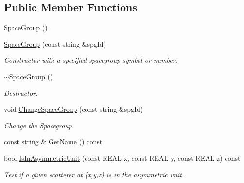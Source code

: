 \subsection*{Public Member Functions}
\begin{DoxyCompactItemize}
\item 
\mbox{\hyperlink{class_obj_cryst_1_1_space_group_a5f5f5b814480e6ab109c22926cc359ca}{Space\+Group}} ()
\item 
\mbox{\hyperlink{class_obj_cryst_1_1_space_group_a5db1daaae23fab45637555f74c705b3e}{Space\+Group}} (const string \&spg\+Id)
\begin{DoxyCompactList}\small\item\em Constructor with a specified spacegroup symbol or number. \end{DoxyCompactList}\item 
\mbox{\label{class_obj_cryst_1_1_space_group_a9dfc390a5e455426c323ee7a8d6ced10}} 
\mbox{\hyperlink{class_obj_cryst_1_1_space_group_a9dfc390a5e455426c323ee7a8d6ced10}{$\sim$\+Space\+Group}} ()
\begin{DoxyCompactList}\small\item\em Destructor. \end{DoxyCompactList}\item 
\mbox{\label{class_obj_cryst_1_1_space_group_af592aa42f04d02e4caecbf2b93031be8}} 
void \mbox{\hyperlink{class_obj_cryst_1_1_space_group_af592aa42f04d02e4caecbf2b93031be8}{Change\+Space\+Group}} (const string \&spg\+Id)
\begin{DoxyCompactList}\small\item\em Change the Spacegroup. \end{DoxyCompactList}\item 
const string \& \mbox{\hyperlink{class_obj_cryst_1_1_space_group_a4b8bd009db507295c21fa88ad154a8a6}{Get\+Name}} () const
\item 
\mbox{\label{class_obj_cryst_1_1_space_group_ad69342f0b97ad491c7aa5cb5061e9261}} 
bool \mbox{\hyperlink{class_obj_cryst_1_1_space_group_ad69342f0b97ad491c7aa5cb5061e9261}{Is\+In\+Asymmetric\+Unit}} (const R\+E\+AL x, const R\+E\+AL y, const R\+E\+AL z) const
\begin{DoxyCompactList}\small\item\em Test if a given scatterer at (x,y,z) is in the asymmetric unit. \end{DoxyCompactList}\item 

\end{DoxyCompactItemize}
